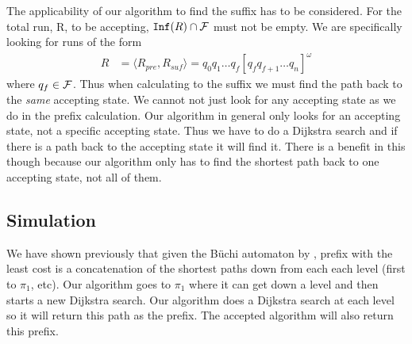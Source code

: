 The applicability of our algorithm to find the suffix has to be considered. For the total run, R, to be accepting, $\texttt{Inf}(R) \cap \mathcal{F}$ must not be empty. We are specifically looking for runs of the form 
\begin{align*}
R &= \langle R_{pre}, R_{suf} \rangle = q_0 q_1 \dots q_f [q_f q_{f+1} \dots q_n]^\omega
\end{align*}     
where $q_f \in \mathcal{F}$. Thus when calculating to the suffix we must find the path back to the \textit{same} accepting state. We cannot not just look for any accepting state as we do in the prefix calculation. Our algorithm in general only looks for an accepting state, not a specific accepting state. Thus we have to do a Dijkstra search and if there is a path back to the accepting state it will find it. There is a benefit in this though because our algorithm only has to find the shortest path back to one accepting state, not all of them.


\subsection{Simulation}





We have shown previously that given the B\"{u}chi automaton by \cite{ltlbuchiwebsite}, prefix with the least cost is a concatenation of the shortest paths down from each each level (first to $\pi_1$, etc). Our algorithm goes to $\pi_1$ where it can get down a level and then starts a new Dijkstra search. Our algorithm does a Dijkstra search at each level so it will return this path as the prefix. The accepted algorithm will also return this prefix. 

